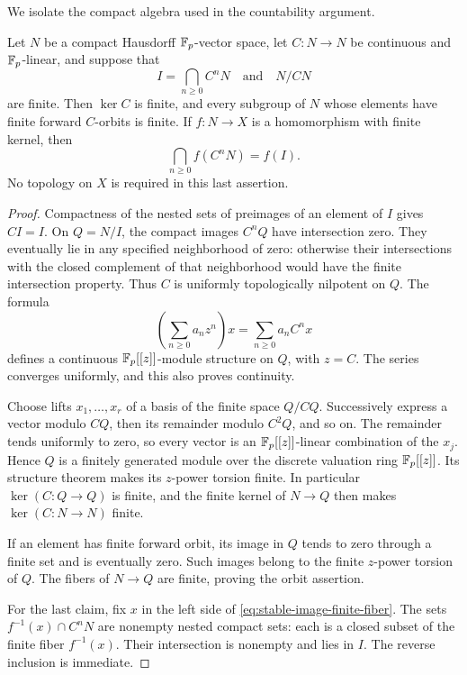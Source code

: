 We isolate the compact algebra used in the countability argument.

\begin{lemma}
\label{lem:compact-operator}
Let $N$ be a compact Hausdorff $\mathbb F_p$-vector space, let $C:N\to N$
be continuous and $\mathbb F_p$-linear, and suppose that
\[
 I=\bigcap_{n\ge0}C^nN
 \quad\text{and}\quad N/CN
\]
are finite.  Then $\ker C$ is finite, and every subgroup of $N$
whose elements have finite forward $C$-orbits is finite.  If
$f:N\to X$ is a homomorphism with finite kernel, then
\begin{equation}
 \label{eq:stable-image-finite-fiber}
 \bigcap_{n\ge0}f(C^nN)=f(I).
\end{equation}
No topology on $X$ is required in this last assertion.
\end{lemma}

\begin{proof}
Compactness of the nested sets of preimages of an element of $I$
gives $CI=I$.  On $Q=N/I$, the compact images $C^nQ$ have
intersection zero.  They eventually lie in any specified
neighborhood of zero: otherwise their intersections with the
closed complement of that neighborhood would have the finite
intersection property.  Thus $C$ is uniformly topologically
nilpotent on $Q$.  The formula
\[
 \left(\sum_{n\ge0}a_nz^n\right)x
   =\sum_{n\ge0}a_nC^nx
\]
defines a continuous $\mathbb F_p[[z]]$-module structure on $Q$, with $z=C$.
The series converges uniformly, and this also proves continuity.

Choose lifts $x_1,\ldots,x_r$ of a basis of the finite space $Q/CQ$.
Successively express a vector modulo $CQ$, then its remainder
modulo $C^2Q$, and so on.  The remainder tends uniformly to zero,
so every vector is an $\mathbb F_p[[z]]$-linear combination of the $x_j$.
Hence $Q$ is a finitely generated module over the discrete valuation
ring $\mathbb F_p[[z]]$.  Its structure theorem makes its $z$-power torsion
finite.  In particular $\ker(C:Q\to Q)$ is finite, and the finite
kernel of $N\to Q$ then makes $\ker(C:N\to N)$ finite.

If an element has finite forward orbit, its image in $Q$ tends to
zero through a finite set and is eventually zero.  Such images
belong to the finite $z$-power torsion of $Q$.  The fibers of
$N\to Q$ are finite, proving the orbit assertion.

For the last claim, fix $x$ in the left side of
\eqref{eq:stable-image-finite-fiber}.  The sets
$f^{-1}(x)\cap C^nN$ are nonempty nested compact sets: each is a
closed subset of the finite fiber $f^{-1}(x)$.  Their intersection
is nonempty and lies in $I$.  The reverse inclusion is immediate.
\end{proof}


